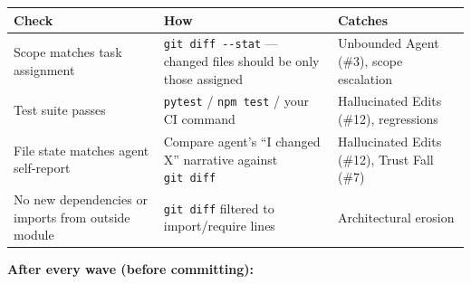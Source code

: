 \documentclass[
  a4paper,
  DIV=11,
  numbers=noendperiod]{scrreprt}
\newcounter{none} %
\begin{document}
{\def\LTcaptype{none} %
\begin{longtable}[]{@{}
  >{\raggedright\arraybackslash}p{}
  >{\raggedright\arraybackslash}p{}
  >{\raggedright\arraybackslash}p{}@{}}
\toprule\noalign{}
\begin{minipage}[b]{\linewidth}\raggedright
Check
\end{minipage} & \begin{minipage}[b]{\linewidth}\raggedright
How
\end{minipage} & \begin{minipage}[b]{\linewidth}\raggedright
Catches
\end{minipage} \\
\midrule\noalign{}
\endhead
\bottomrule\noalign{}
\endlastfoot
Scope matches task assignment & \texttt{git\ diff\ -\/-stat} --- changed
files should be only those assigned & Unbounded Agent (\#3), scope
escalation \\
Test suite passes & \texttt{pytest} / \texttt{npm\ test} / your CI
command & Hallucinated Edits (\#12), regressions \\
File state matches agent self-report & Compare agent's ``I changed X''
narrative against \texttt{git\ diff} & Hallucinated Edits (\#12), Trust
Fall (\#7) \\
No new dependencies or imports from outside module & \texttt{git\ diff}
filtered to import/require lines & Architectural erosion \\
\end{longtable}
}

\textbf{After every wave (before committing):}
\end{document}
